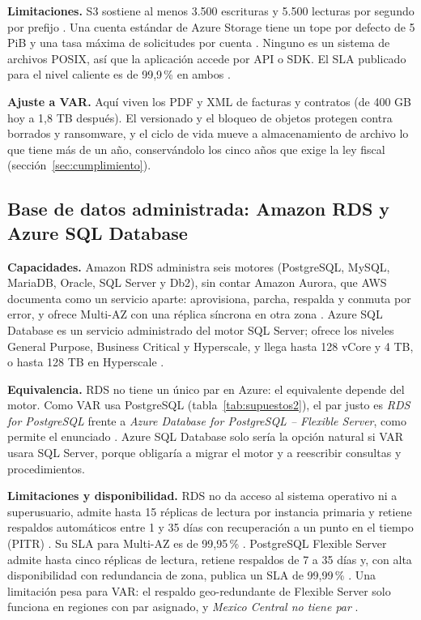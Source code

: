 \documentclass[11pt,letterpaper]{article}
\begin{document}
\textbf{Limitaciones.} S3 sostiene al menos 3.500 escrituras y 5.500 lecturas por segundo por prefijo \parencite{aws-s3-perf}. Una cuenta estándar de Azure Storage tiene un tope por defecto de 5 PiB y una tasa máxima de solicitudes por cuenta \parencite{az-blob-scale}. Ninguno es un sistema de archivos POSIX, así que la aplicación accede por API o SDK. El SLA publicado para el nivel caliente es de 99,9\,\% en ambos \parencite{aws-sla-s3,az-sla}.

\textbf{Ajuste a VAR.} Aquí viven los PDF y XML de facturas y contratos (de 400 GB hoy a 1,8 TB después). El versionado y el bloqueo de objetos protegen contra borrados y ransomware, y el ciclo de vida mueve a almacenamiento de archivo lo que tiene más de un año, conservándolo los cinco años que exige la ley fiscal (sección~\ref{sec:cumplimiento}).

\subsection{Base de datos administrada: Amazon RDS y Azure SQL Database}
\textbf{Capacidades.} Amazon RDS administra seis motores (PostgreSQL, MySQL, MariaDB, Oracle, SQL Server y Db2), sin contar Amazon Aurora, que AWS documenta como un servicio aparte: aprovisiona, parcha, respalda y conmuta por error, y ofrece Multi-AZ con una réplica síncrona en otra zona \parencite{aws-rds,aws-rds-maz}. Azure SQL Database es un servicio administrado del motor SQL Server; ofrece los niveles General Purpose, Business Critical y Hyperscale, y llega hasta 128 vCore y 4 TB, o hasta 128 TB en Hyperscale \parencite{az-sqldb}.

\textbf{Equivalencia.} RDS no tiene un único par en Azure: el equivalente depende del motor. Como VAR usa PostgreSQL (tabla~\ref{tab:supuestos2}), el par justo es \emph{RDS for PostgreSQL} frente a \emph{Azure Database for PostgreSQL – Flexible Server}, como permite el enunciado \parencite{az-pg}. Azure SQL Database solo sería la opción natural si VAR usara SQL Server, porque obligaría a migrar el motor y a reescribir consultas y procedimientos.

\textbf{Limitaciones y disponibilidad.} RDS no da acceso al sistema operativo ni a superusuario, admite hasta 15 réplicas de lectura por instancia primaria y retiene respaldos automáticos entre 1 y 35 días con recuperación a un punto en el tiempo (PITR) \parencite{aws-rds-limits,aws-rds-backup}. Su SLA para Multi-AZ es de 99,95\,\% \parencite{aws-sla-rds}. PostgreSQL Flexible Server admite hasta cinco réplicas de lectura, retiene respaldos de 7 a 35 días y, con alta disponibilidad con redundancia de zona, publica un SLA de 99,99\,\% \parencite{az-pg-replicas,az-pg-backup,az-pg-ha}. Una limitación pesa para VAR: el respaldo geo-redundante de Flexible Server solo funciona en regiones con par asignado, y \emph{Mexico Central no tiene par} \parencite{az-pg-backup,az-pairs}.
\end{document}
